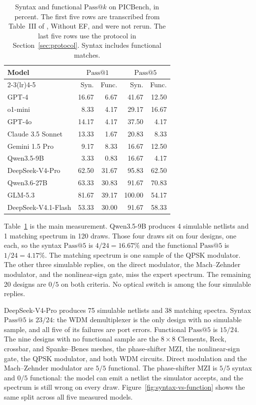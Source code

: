 \documentclass[11pt]{article}
\makeatletter
\newcommand{\passk}[1]{\mathrm{Pass@}#1}
\makeatother
\begin{document}
\begin{table}[H]
\caption{Syntax and functional $\passk{k}$ on PICBench, in percent.
The first five rows are transcribed from Table~III of \citet{wu2025picbench}, Without EF, and were not rerun.
The last five rows use the protocol in Section~\ref{sec:protocol}.
Syntax includes functional matches.}
\label{tab:published}
\begin{center}
\begin{small}
\begin{tabular}{lrrrr}
\toprule
Model & \multicolumn{2}{c}{$\passk{1}$} & \multicolumn{2}{c}{$\passk{5}$} \\
\cmidrule(lr){2-3}\cmidrule(lr){4-5}
 & Syn. & Func. & Syn. & Func. \\
\midrule
GPT-4 & 16.67 & 6.67 & 41.67 & 12.50 \\
o1-mini & 8.33 & 4.17 & 29.17 & 16.67 \\
GPT-4o & 14.17 & 4.17 & 37.50 & 4.17 \\
Claude 3.5 Sonnet & 13.33 & 1.67 & 20.83 & 8.33 \\
Gemini 1.5 Pro & 9.17 & 8.33 & 16.67 & 12.50 \\
\midrule
Qwen3.5-9B & 3.33 & 0.83 & 16.67 & 4.17 \\
DeepSeek-V4-Pro & 62.50 & 31.67 & 95.83 & 62.50 \\
Qwen3.6-27B & 63.33 & 30.83 & 91.67 & 70.83 \\
GLM-5.3 & 81.67 & 39.17 & 100.00 & 54.17 \\
DeepSeek-V4.1-Flash & 53.33 & 30.00 & 91.67 & 58.33 \\
\bottomrule
\end{tabular}
\end{small}
\end{center}
\end{table}

Table~\ref{tab:published} is the main measurement.
Qwen3.5-9B produces 4 simulable netlists and 1 matching spectrum in 120 draws.
Those four draws sit on four designs, one each, so the syntax $\passk{5}$ is $4/24 = 16.67\%$ and the functional $\passk{5}$ is $1/24 = 4.17\%$.
The matching spectrum is one sample of the QPSK modulator.
The other three simulable replies, on the direct modulator, the Mach--Zehnder modulator, and the nonlinear-sign gate, miss the expert spectrum.
The remaining 20 designs are $0/5$ on both criteria.
No optical switch is among the four simulable replies.

DeepSeek-V4-Pro produces 75 simulable netlists and 38 matching spectra.
Syntax $\passk{5}$ is $23/24$: the WDM demultiplexer is the only design with no simulable sample, and all five of its failures are port errors.
Functional $\passk{5}$ is $15/24$.
The nine designs with no functional sample are the $8 \times 8$ Clements, Reck, crossbar, and Spanke--Benes meshes, the phase-shifter MZI, the nonlinear-sign gate, the QPSK modulator, and both WDM circuits.
Direct modulation and the Mach--Zehnder modulator are $5/5$ functional.
The phase-shifter MZI is $5/5$ syntax and $0/5$ functional: the model can emit a netlist the simulator accepts, and the spectrum is still wrong on every draw.
Figure~\ref{fig:syntax-vs-function} shows the same split across all five measured models.
\end{document}

